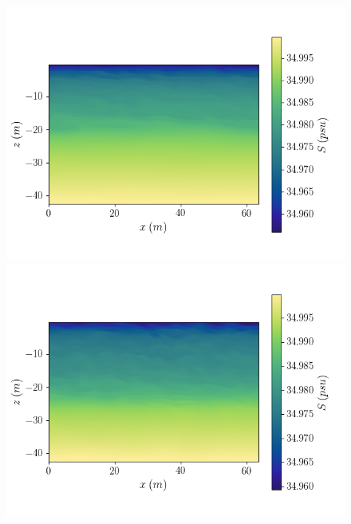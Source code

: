 \documentclass[draft]{agujournal2019}
\begin{document}
\begin{figure}[h!]
\begin{minipage}{0.4\textwidth}
        \includegraphics[trim={0 1cm 4cm 1cm},clip,width=\textwidth]{Figures/dslope2/sa_xz_y64_zmax42_t40.png}
    \end{minipage}%
    \begin{minipage}{0.55\textwidth}
        \includegraphics[trim={0 1cm 0 1cm},clip,width=\textwidth]{Figures/dT1/sa_xz_y64_zmax42_t40.png}
    \end{minipage}
    \begin{minipage}{0.45\textwidth}

\end{minipage}
\end{figure}
\end{document}
